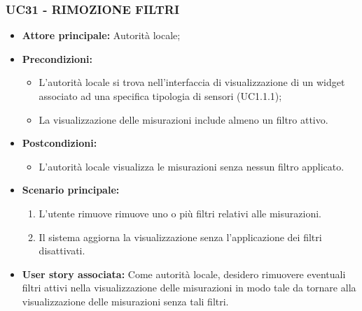 \subsubsection{UC31 - RIMOZIONE FILTRI}
\begin{itemize}
    \item \textbf{Attore principale:} Autorità locale;
    \item \textbf{Precondizioni:}
        \begin{itemize}
        \item L'autorità locale si trova nell'interfaccia di visualizzazione di un widget associato ad una specifica tipologia di sensori (UC1.1.1);
        \item La visualizzazione delle misurazioni include almeno un filtro attivo.
        \end{itemize}
    \item \textbf{Postcondizioni:}
        \begin{itemize}
            \item L'autorità locale visualizza le misurazioni senza nessun filtro applicato.
        \end{itemize}
    \item \textbf{Scenario principale:}
        \begin{enumerate}
            \item L'utente rimuove rimuove uno o più filtri relativi alle misurazioni.
            \item Il sistema aggiorna la visualizzazione senza l'applicazione dei filtri disattivati.
        \end{enumerate}
    \item \textbf{User story associata:}
        Come autorità locale, desidero rimuovere eventuali filtri attivi nella visualizzazione delle misurazioni in modo tale da tornare alla visualizzazione delle misurazioni senza tali filtri.
\end{itemize}
